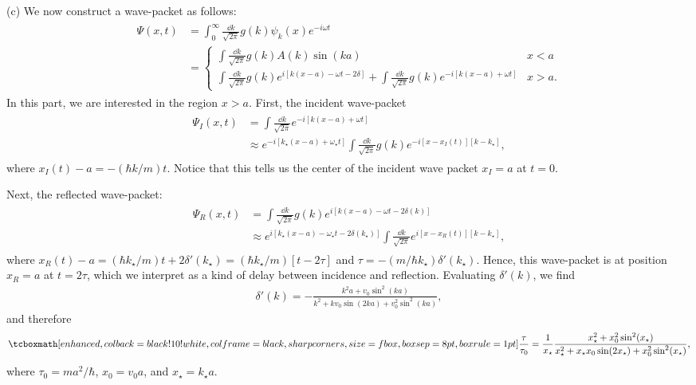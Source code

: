 {(c) We now construct a wave-packet as follows:
\begin{eqnarray}
    \begin{aligned}
        \Psi(x,t) &= \int_{0}^{\infty} \frac{\dd{k}}{\sqrt{2 \pi}} g(k) \psi_{k}(x) e^{-i \omega t} \\
                  &= \begin{cases}
                      \displaystyle \int \frac{\dd{k}}{\sqrt{2\pi}} g(k) A(k) \sin(ka) & x < a \\
                      \displaystyle \int \frac{\dd{k}}{\sqrt{2\pi}} g(k) e^{i[k(x-a) - \omega t - 2\delta]} + \int \frac{\dd{k}}{\sqrt{2 \pi}} g(k) e^{-i[k(x-a) + \omega t]} & x > a
                  .\end{cases}
    \end{aligned}
\end{eqnarray}
In this part, we are interested in the region $x > a$.
First, the incident wave-packet
\begin{eqnarray}
    \begin{aligned}
        \Psi_{I}(x,t) &= \int \frac{\dd{k}}{\sqrt{2 \pi}} e^{-i[k(x-a) + \omega t]} \\
                      &\approx e^{-i[k_{\star}(x-a) + \omega_{\star} t]} \int \frac{\dd{k}}{\sqrt{2\pi}} g(k) e^{-i[x-x_{I}(t)][k-k_{\star}]}
    ,\end{aligned}
\end{eqnarray}
where $x_{I}(t) - a = -(\hbar k / m) t$.
Notice that this tells us the center of the incident wave packet $x_{I} = a$ at $t = 0$.

Next, the reflected wave-packet:
\begin{eqnarray}
    \begin{aligned}
        \Psi_{R}(x,t) &= \int \frac{\dd{k}}{\sqrt{2\pi}} g(k) e^{i[k(x-a) - \omega t - 2\delta(k)]} \\
                      &\approx e^{i[k_{\star}(x-a) - \omega_{\star} t - 2\delta(k_{\star})]} \int \frac{\dd{k}}{\sqrt{2 \pi}} e^{i[x-x_{R}(t)][k - k_{\star}]}
    ,\end{aligned}
\end{eqnarray}
where $x_{R}(t) - a = (\hbar k_{\star}/m)t + 2\delta'(k_{\star}) = (\hbar k_{\star}/m)[t - 2\tau]$ and $\tau = -(m/\hbar k_{\star}) \delta'(k_{\star})$.
Hence, this wave-packet is at position $x_{R} = a$ at $t = 2\tau$, which we interpret as a kind of delay between incidence and reflection.
Evaluating $\delta'(k)$, we find
\begin{eqnarray}
    \delta'(k) = - \frac{k^2a + v_0\sin^2(ka)}{k^2 + kv_0 \sin(2ka) + v_0^2 \sin^2(ka)}
,\end{eqnarray}
and therefore
\begin{eqnarray}
    \eqbox{ \frac{\tau}{\tau_0} = \frac{1}{x_{\star}} \frac{x_{\star}^2 + x_0^2 \sin^2(x_{\star})}{x_{\star}^2 + x_{\star} x_0 \sin(2x_{\star}) + x_0^2 \sin^2(x_{\star})} }
,\end{eqnarray}
where $\tau_0 = ma^2/\hbar$, $x_0 = v_0 a$, and $x_{\star} = k_{\star} a$.

}
